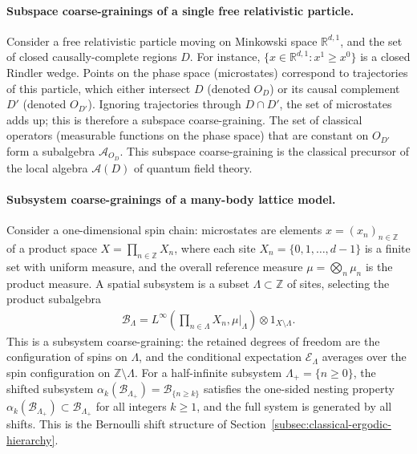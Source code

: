 \documentclass[a4paper,11pt]{article}
\theoremstyle{definition}
\theoremstyle{remark}
\newcommand{\mA}{\mathcal{A}}
\newcommand{\mB}{\mathcal{B}}
\newcommand{\mE}{\mathcal{E}}
\begin{document}
\paragraph{Subspace coarse-grainings of a single free relativistic particle.}
Consider a free relativistic particle moving on Minkowski space $\mathbb{R}^{d,1}$,
and the set of closed causally-complete regions $D$.  For instance,
$\{x\in\mathbb{R}^{d,1}:x^1\ge x^0\}$ is a closed Rindler wedge.  Points on the
phase space (microstates) correspond to trajectories of this particle, which either
intersect $D$ (denoted $O_D$) or its causal complement $D'$ (denoted $O_{D'}$).
Ignoring trajectories through $D\cap D'$, the set of microstates adds up; this is
therefore a subspace coarse-graining.  The set of classical operators (measurable
functions on the phase space) that are constant on $O_{D'}$ form a subalgebra
$\mA_{O_D}$.  This subspace coarse-graining is the classical precursor of the local
algebra $\mathcal{A}(D)$ of quantum field theory.
 
\paragraph{Subsystem coarse-grainings of a many-body lattice model.}
Consider a one-dimensional spin chain: microstates are elements $x=(x_n)_{n\in\mathbb{Z}}$
of a product space $X=\prod_{n\in\mathbb{Z}}X_n$, where each site $X_n=\{0,1,\ldots,d-1\}$
is a finite set with uniform measure, and the overall reference measure
$\mu=\bigotimes_n\mu_n$ is the product measure.  A spatial subsystem is a subset
$\Lambda\subset\mathbb{Z}$ of sites, selecting the product subalgebra
\begin{align}
    \mB_\Lambda = L^\infty\!\left(\prod_{n\in\Lambda}X_n,\mu|_\Lambda\right)\otimes 1_{X\setminus\Lambda}.
\end{align}
This is a subsystem coarse-graining: the retained degrees of freedom are the
configuration of spins on $\Lambda$, and the conditional expectation $\mE_\Lambda$
averages over the spin configuration on $\mathbb{Z}\setminus\Lambda$.  For a
half-infinite subsystem $\Lambda_+=\{n\ge0\}$, the shifted subsystem
$\alpha_k(\mB_{\Lambda_+})=\mB_{\{n\ge k\}}$ satisfies the one-sided nesting property
$\alpha_k(\mB_{\Lambda_+})\subset\mB_{\Lambda_+}$ for all integers $k\ge1$, and the
full system is generated by all shifts.  This is the Bernoulli shift structure of
Section~\ref{subsec:classical-ergodic-hierarchy}.
 
\end{document}
